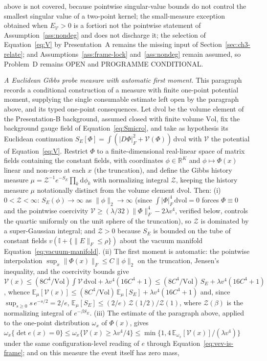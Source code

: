 above is not covered, because pointwise singular-value bounds do not control the smallest singular value of a two-point kernel; the small-measure exception obtained when \(E_{\mathcal V}>0\) is a fortiori not the pointwise statement of Assumption~\ref{ass:nondeg} and does not discharge it; the selection of Equation~\eqref{eq:V} by Presentation~A remains the missing input of Section~\ref{sec:ch3-relate}; and Assumptions~\ref{ass:frame-lock} and~\ref{ass:nondeg} remain assumed, so Problem~D remains OPEN and PROGRAMME CONDITIONAL.

\emph{A Euclidean Gibbs probe measure with automatic first moment.} This paragraph records a conditional construction of a measure with finite one-point potential moment, supplying the single consumable estimate left open by the paragraph above, and its typed one-point consequences. Let \(\mathrm{dvol}\) be the volume element of the Presentation-B background, assumed closed with finite volume \(\mathrm{Vol}\), fix the background gauge field of Equation~\eqref{eq:Smicro}, and take as hypothesis its Euclidean continuation \(S_E[\Phi]=\int(\lvert D\Phi\rvert_F^2+\mathcal V(\Phi))\,\mathrm{dvol}\) with \(\mathcal V\) the potential of Equation~\eqref{eq:V}. Restrict \(\Phi\) to a finite-dimensional real-linear space of matrix fields containing the constant fields, with coordinates \(\phi\in\mathbb R^K\) and \(\phi\mapsto\Phi(x)\) linear and non-zero at each \(x\) (the truncation), and define the Gibbs history measure \(\mu=\mathcal Z^{-1}e^{-S_E}\prod_k\mathrm d\phi_k\) with normalizing integral \(\mathcal Z\), keeping the history measure \(\mu\) notationally distinct from the volume element \(\mathrm{dvol}\). Then: (i) \(0<\mathcal Z<\infty\): \(S_E(\phi)\to\infty\) as \(\lVert\phi\rVert_2\to\infty\) (since \(\int\lvert\Phi\rvert_F^4\,\mathrm{dvol}=0\) forces \(\Phi\equiv0\) and the pointwise coercivity \(\mathcal V\ge(\lambda/32)\lVert\Phi\rVert_F^4-2\lambda v^4\), verified below, controls the quartic uniformly on the unit sphere of the truncation), so \(\mathcal Z\) is dominated by a super-Gaussian integral; and \(\mathcal Z>0\) because \(S_E\) is bounded on the tube of constant fields \(v(\mathbb I+\{\lVert E\rVert_F\le\rho\})\) about the vacuum manifold Equation~\eqref{eq:vacuum-manifold}. (ii) The first moment is automatic: the pointwise interpolation \(\sup_x\lVert\Phi(x)\rVert_F\le C\lVert\phi\rVert_2\) on the truncation, Jensen's inequality, and the coercivity bounds give \(\mathcal V(x)\le(8C^4/\mathrm{Vol})\int\mathcal V\,\mathrm{dvol}+\lambda v^4(16C^4+1)\le(8C^4/\mathrm{Vol})\,S_E+\lambda v^4(16C^4+1)\), whence \(\mathbb E_\mu[\mathcal V(x)]\le(8C^4/\mathrm{Vol})\,\mathbb E_\mu[S_E]+\lambda v^4(16C^4+1)\) and, since \(\sup_{s\ge0}s\,e^{-s/2}=2/e\), \(\mathbb E_\mu[S_E]\le(2/e)\,\mathcal Z(1/2)/\mathcal Z(1)\), where \(\mathcal Z(\beta)\) is the normalizing integral of \(e^{-\beta S_E}\). (iii) The estimate of the paragraph above, applied to the one-point distribution \(\omega_x\) of \(\Phi(x)\), gives \(\omega_x\{\det e(x)=0\}\le\omega_x\{\mathcal V(x)\ge\lambda v^4/4\}\le\min\{1,4\,\mathbb E_{\omega_x}[\mathcal V(x)]/(\lambda v^4)\}\) under the same configuration-level reading of \(e\) through Equation~\eqref{eq:vev-is-frame}; and on this measure the event itself has zero mass, 
